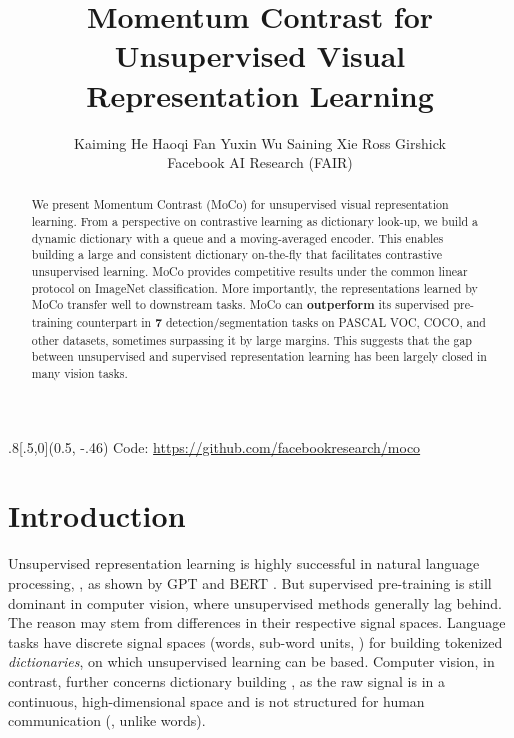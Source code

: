 \documentclass[10pt,twocolumn,letterpaper]{article}
\begin{document}
\title{Momentum Contrast for Unsupervised Visual Representation Learning \vspace{-.5em}}

\author{
\vspace{.5em}
 Kaiming He \quad Haoqi Fan \quad Yuxin Wu \quad Saining Xie \quad Ross Girshick \vspace{.5em}\\
 Facebook AI Research (FAIR) \vspace{.3em}
}

\maketitle

\begin{abstract}
\vspace{-.5em}
We present Momentum Contrast (MoCo) for unsupervised visual representation learning. From a perspective on contrastive learning \cite{Hadsell2006} as dictionary look-up, we build a dynamic dictionary with a queue and a moving-averaged encoder. This enables building a large and consistent dictionary on-the-fly that facilitates contrastive unsupervised learning. MoCo provides competitive results under the common linear protocol on ImageNet classification. More importantly, the representations learned by MoCo transfer well to downstream tasks. MoCo can \textbf{outperform} its supervised pre-training counterpart in \textbf{7} detection/segmentation tasks on PASCAL VOC, COCO, and other datasets, sometimes surpassing it by large margins. This suggests that the gap between unsupervised and supervised representation learning has been largely closed in many vision tasks.

\vspace{-1em}
\end{abstract}

\begin{textblock*}{.8\textwidth}[.5,0](0.5\textwidth, -.46\textwidth)
\centering
{\small Code: \url{https://github.com/facebookresearch/moco}}
\end{textblock*}


\section{Introduction}

Unsupervised representation learning is highly successful in natural language processing, \eg, as shown by GPT \cite{Radford2018,Radford2019} and BERT \cite{Devlin2019}. But supervised pre-training is still dominant in computer vision, where unsupervised methods generally lag behind. The reason may stem from differences in their respective signal spaces. Language tasks have \mbox{discrete} signal spaces (words, sub-word units, \etc) for building tokenized \emph{dictionaries}, on which unsupervised learning can be based.
Computer vision, in contrast, further concerns dictionary building \cite{Sivic2003,Coates2011,Chatfield2011}, as the raw signal is in a continuous, high-dimensional space and is not structured for human communication (\eg, unlike words).
\end{document}
